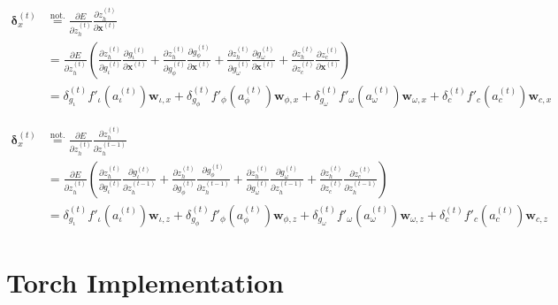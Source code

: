 \documentclass[11pt]{article}
\begin{document}
\begin{equation}
\begin{split}
    \boldsymbol{\delta}_x^{(t)} &\overset{\text{not.}}{=} \displaystyle\frac{\partial E}{\partial z_h^{(t)}}  \displaystyle\frac{\partial z_h^{(t)}}{\partial \mathbf{x}^{(t)}} \\
    &= \displaystyle\frac{\partial E}{\partial z_h^{(t)}} \left(
            \displaystyle\frac{\partial z_h^{(t)}}{\partial g_{\iota}^{(t)}} \displaystyle\frac{\partial g_{\iota}^{(t)}}{\partial \mathbf{x}^{(t)}} +
            \displaystyle\frac{\partial z_h^{(t)}}{\partial g_{\phi}^{(t)}} \displaystyle\frac{\partial g_{\phi}^{(t)}}{\partial \mathbf{x}^{(t)}} +
            \displaystyle\frac{\partial z_h^{(t)}}{\partial g_{\omega}^{(t)}} \displaystyle\frac{\partial g_{\omega}^{(t)}}{\partial \mathbf{x}^{(t)}} +
            \displaystyle\frac{\partial z_h^{(t)}}{\partial z_{c}^{(t)}} \displaystyle\frac{\partial z_{c}^{(t)}}{\partial \mathbf{x}^{(t)}} \right)\\
            &= \delta_{g_{\iota}}^{(t)} f'_{\iota}\left(a_{\iota}^{(t)}\right) \mathbf{w}_{\iota, x} +
               \delta_{g_{\phi}}^{(t)} f'_{\phi}\left(a_{\phi}^{(t)}\right) \mathbf{w}_{\phi, x} +
               \delta_{g_{\omega}}^{(t)} f'_{\omega}\left(a_{\omega}^{(t)}\right) \mathbf{w}_{\omega, x} +
               \delta_{c}^{(t)} f'_{c}\left(a_{c}^{(t)}\right) \mathbf{w}_{c, x}
\end{split}    
\end{equation}

\begin{equation}
\begin{split}
    \boldsymbol{\delta}_x^{(t)} &\overset{\text{not.}}{=} \displaystyle\frac{\partial E}{\partial z_h^{(t)}}  \displaystyle\frac{\partial z_h^{(t)}}{\partial z_h^{(t-1)}} \\
    &= \displaystyle\frac{\partial E}{\partial z_h^{(t)}} \left(
            \displaystyle\frac{\partial z_h^{(t)}}{\partial g_{\iota}^{(t)}} \displaystyle\frac{\partial g_{\iota}^{(t)}}{\partial z_h^{(t-1)}} +
            \displaystyle\frac{\partial z_h^{(t)}}{\partial g_{\phi}^{(t)}} \displaystyle\frac{\partial g_{\phi}^{(t)}}{\partial z_h^{(t-1)}} +
            \displaystyle\frac{\partial z_h^{(t)}}{\partial g_{\omega}^{(t)}} \displaystyle\frac{\partial g_{\omega}^{(t)}}{\partial z_h^{(t-1)}} +
            \displaystyle\frac{\partial z_h^{(t)}}{\partial z_{c}^{(t)}} \displaystyle\frac{\partial z_{c}^{(t)}}{\partial z_h^{(t-1)}} \right)\\
            &= \delta_{g_{\iota}}^{(t)} f'_{\iota}\left(a_{\iota}^{(t)}\right) \mathbf{w}_{\iota, z} +
               \delta_{g_{\phi}}^{(t)} f'_{\phi}\left(a_{\phi}^{(t)}\right) \mathbf{w}_{\phi, z} +
               \delta_{g_{\omega}}^{(t)} f'_{\omega}\left(a_{\omega}^{(t)}\right) \mathbf{w}_{\omega, z} +
               \delta_{c}^{(t)} f'_{c}\left(a_{c}^{(t)}\right) \mathbf{w}_{c, z}
\end{split}    
\end{equation}

\section{Torch Implementation}
\label{sec:torch}

\appendix

\printbibliography
\end{document}
